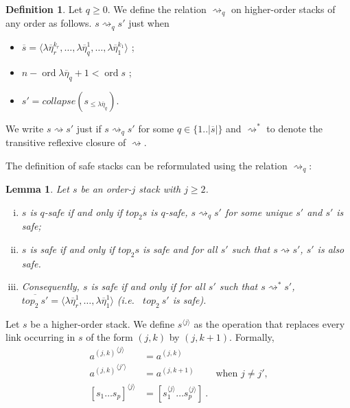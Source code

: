 \documentclass{article}
\newcommand{\ord}{\mathop{\mathrm{ord}}}
\newcommand{\prefixof}{\leqslant}
\newtheorem{lemma}{Lemma}[section]
\theoremstyle{remark}
\theoremstyle{definition}
\newtheorem{definition}{Definition}[section]
\newcommand\orddec\overline
\newcommand\saferel\rightsquigarrow
\begin{document}
\begin{definition}
Let $q\geq 0$. We define the relation $\saferel_q$ on higher-order
stacks of any order as follows. $s \saferel_q s'$ just when
\begin{itemize}
\item $\orddec{s} = \langle \lambda \overline{\eta}_r^{k_r}, \ldots , \lambda
\overline{\eta}_q^1, \ldots, \lambda \overline{\eta}_1^{k_1} \rangle$ ;
\item $n - \ord{\lambda \overline{\eta}_q} + 1 < \ord{s}$ ;
\item $s' = collapse (s_{\prefixof \lambda \overline{\eta}_q})$.
\end{itemize}

We write $s \saferel s'$ just if $s \saferel_q s'$ for some $q\in \{1..|\orddec{s}|\}$
and $\saferel^*$ to denote the transitive reflexive closure of $\saferel$.
\end{definition}
The definition of safe stacks can be reformulated using the relation $\saferel_q$:
\begin{lemma}
\label{lem:qsafety_equivdef}
 Let $s$ be an order-$j$ stack with $j\geq 2$.
\begin{enumerate}[i.]
  \item $s$ is $q$-safe if and only if $top_2 s$ is $q$-safe, $s \saferel_q s'$ for some unique $s'$ and $s'$ is safe;
  \item $s$ is safe if and only if $top_2 s$ is safe and for all $s'$ such that $s \saferel s'$, $s'$ is also safe.

  \item Consequently, $s$ is safe if and only if for all $s'$ such that $s \saferel^*
s'$, $\orddec{top_2\ s'} = \langle \lambda \overline{\eta}_r^1,
\ldots , \lambda \overline{\eta}_1^{1} \rangle$ ({\it i.e.}~ $top_2\ s'$ is safe).
\end{enumerate}
\end{lemma}

Let $s$ be a higher-order stack. We define $s^{\langle j \rangle}$ as the operation that replaces
every link occurring in $s$ of the form $(j,k)$ by $(j,k+1)$. Formally,
\begin{align*}
{a^{(j,k)}}^{\langle j \rangle} &= a^{(j,k)}   \\
{a^{(j,k)}}^{\langle j' \rangle} &= a^{(j,k+1)} &   \mbox{when $j\neq j'$,}\\
[s_1 \ldots s_p]^{\langle j \rangle} &= [s_1^{\langle j \rangle} \ldots s_p^{\langle j \rangle}] \ .
\end{align*}
\end{document}
